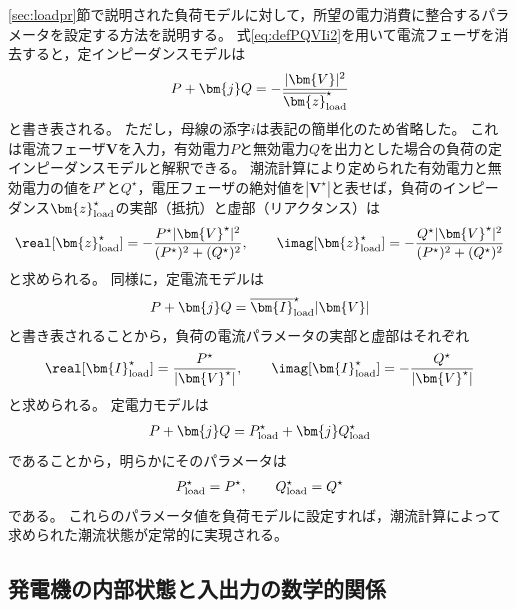 \documentclass[tombow,dvipdfmx]{corona-a5-1.1}
\begin{document}
\ref{sec:loadpr}節で説明された負荷モデルに対して，所望の電力消費に整合するパラメータを設定する方法を説明する。
式\ref{eq:defPQVIi2}を用いて電流フェーザを消去すると，定インピーダンスモデルは
\begin{align}\label{eq:lmodimp}
P + \bm{j} Q = -\frac{|\bm{V}|^2}{\overline{\bm{z}}_{\rm load}^{\star}} 
\end{align}
と書き表される。
ただし，母線の添字$i$は表記の簡単化のため省略した。
これは電流フェーザ$\bm{V}$を入力，有効電力$P$と無効電力$Q$を出力とした場合の負荷の定インピーダンスモデルと解釈できる。
潮流計算により定められた有効電力と無効電力の値を$P^{\star}$と$Q^{\star}$，電圧フェーザの絶対値を$|\bm{V}^{\star}|$と表せば，負荷のインピーダンス$\bm{z}_{\rm load}^{\star}$の実部（抵抗）と虚部（リアクタンス）は
\begin{align}\label{eq:lmodimppara}
\real [\bm{z}_{\rm load}^{\star}] = - \frac{ P^{\star} |\bm{V}^{\star}|^2 }{(P^{\star})^2 + (Q^{\star})^2}
,\qquad
\imag [\bm{z}_{\rm load}^{\star}] = - \frac{ Q^{\star} |\bm{V}^{\star}|^2 }{(P^{\star})^2 + (Q^{\star})^2}
\end{align}
と求められる。
同様に，定電流モデルは
\begin{align}
P + \bm{j} Q = \overline{\bm{I}}_{\rm load}^{\star} |\bm{V}|
\end{align}
と書き表されることから，負荷の電流パラメータの実部と虚部はそれぞれ
\begin{align*}
\real [\bm{I}_{\rm load}^{\star}]
 =\frac{P^{\star} }{|\bm{V}^{\star}|},\qquad
\imag [\bm{I}_{\rm load}^{\star}]
 = -\frac{ Q^{\star} }{|\bm{V}^{\star}|}
\end{align*}
と求められる。
定電力モデルは
\begin{align}
P + \bm{j} Q =
P_{{\rm load}}^{\star} + \bm{j} Q_{{\rm load}}^{\star} 
\end{align}
であることから，明らかにそのパラメータは
\begin{align*}
P_{\rm load}^{\star}=P^{\star}
,\qquad
Q_{\rm load}^{\star}=Q^{\star}
\end{align*}
である。
これらのパラメータ値を負荷モデルに設定すれば，潮流計算によって求められた潮流状態が定常的に実現される。

\subsection{発電機の内部状態と入出力の数学的関係\advanced}\label{sec:genssPQ}
\end{document}
